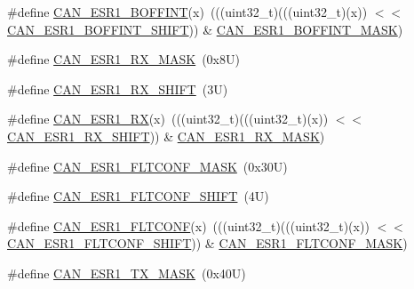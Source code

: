 \begin{DoxyCompactItemize}
\item 
\#define \mbox{\hyperlink{group___c_a_n___register___masks_ga6d893659f78faeeb99ad88aed8626b89}{C\+A\+N\+\_\+\+E\+S\+R1\+\_\+\+B\+O\+F\+F\+I\+NT}}(x)~(((uint32\+\_\+t)(((uint32\+\_\+t)(x)) $<$$<$ \mbox{\hyperlink{group___c_a_n___register___masks_ga5e04e60e6627e38eaf02023308703a2e}{C\+A\+N\+\_\+\+E\+S\+R1\+\_\+\+B\+O\+F\+F\+I\+N\+T\+\_\+\+S\+H\+I\+FT}})) \& \mbox{\hyperlink{group___c_a_n___register___masks_ga0f997f1d2ad00476745755aa74ce5084}{C\+A\+N\+\_\+\+E\+S\+R1\+\_\+\+B\+O\+F\+F\+I\+N\+T\+\_\+\+M\+A\+SK}})
\item 
\#define \mbox{\hyperlink{group___c_a_n___register___masks_ga246ad2ff9dd50d1d6b931b5e42ef90b3}{C\+A\+N\+\_\+\+E\+S\+R1\+\_\+\+R\+X\+\_\+\+M\+A\+SK}}~(0x8\+U)
\item 
\#define \mbox{\hyperlink{group___c_a_n___register___masks_ga5f5f765579cea7bfb561f84e62b96623}{C\+A\+N\+\_\+\+E\+S\+R1\+\_\+\+R\+X\+\_\+\+S\+H\+I\+FT}}~(3\+U)
\item 
\#define \mbox{\hyperlink{group___c_a_n___register___masks_gaac7a90422c4b33dc81179e56f867599d}{C\+A\+N\+\_\+\+E\+S\+R1\+\_\+\+RX}}(x)~(((uint32\+\_\+t)(((uint32\+\_\+t)(x)) $<$$<$ \mbox{\hyperlink{group___c_a_n___register___masks_ga5f5f765579cea7bfb561f84e62b96623}{C\+A\+N\+\_\+\+E\+S\+R1\+\_\+\+R\+X\+\_\+\+S\+H\+I\+FT}})) \& \mbox{\hyperlink{group___c_a_n___register___masks_ga246ad2ff9dd50d1d6b931b5e42ef90b3}{C\+A\+N\+\_\+\+E\+S\+R1\+\_\+\+R\+X\+\_\+\+M\+A\+SK}})
\item 
\#define \mbox{\hyperlink{group___c_a_n___register___masks_ga6c81fa9d3bec21a97a304319968216a8}{C\+A\+N\+\_\+\+E\+S\+R1\+\_\+\+F\+L\+T\+C\+O\+N\+F\+\_\+\+M\+A\+SK}}~(0x30\+U)
\item 
\#define \mbox{\hyperlink{group___c_a_n___register___masks_gadb93c702b83c1240d7b1a07fba1b33a3}{C\+A\+N\+\_\+\+E\+S\+R1\+\_\+\+F\+L\+T\+C\+O\+N\+F\+\_\+\+S\+H\+I\+FT}}~(4\+U)
\item 
\#define \mbox{\hyperlink{group___c_a_n___register___masks_ga280fd558442e907a131d0156629c9a9c}{C\+A\+N\+\_\+\+E\+S\+R1\+\_\+\+F\+L\+T\+C\+O\+NF}}(x)~(((uint32\+\_\+t)(((uint32\+\_\+t)(x)) $<$$<$ \mbox{\hyperlink{group___c_a_n___register___masks_gadb93c702b83c1240d7b1a07fba1b33a3}{C\+A\+N\+\_\+\+E\+S\+R1\+\_\+\+F\+L\+T\+C\+O\+N\+F\+\_\+\+S\+H\+I\+FT}})) \& \mbox{\hyperlink{group___c_a_n___register___masks_ga6c81fa9d3bec21a97a304319968216a8}{C\+A\+N\+\_\+\+E\+S\+R1\+\_\+\+F\+L\+T\+C\+O\+N\+F\+\_\+\+M\+A\+SK}})
\item 
\#define \mbox{\hyperlink{group___c_a_n___register___masks_ga29052f7ad6fc3da4cbcd9dce8ffa59f5}{C\+A\+N\+\_\+\+E\+S\+R1\+\_\+\+T\+X\+\_\+\+M\+A\+SK}}~(0x40\+U)
$$
\end{DoxyCompactItemize}
